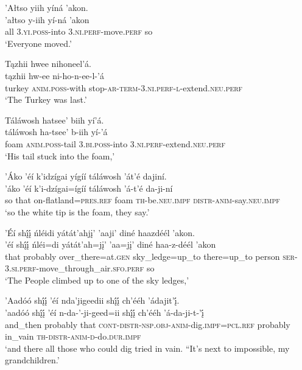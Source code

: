 \ea\label{ex:text4-3-15}
’Ałtso yiih yíná ’akon.\\
\gll ’ałtso	y-iih	yí-ná	’akon\\
     all	3.\textsc{yi}.\textsc{poss}-into	3.\textsc{ni}.\textsc{perf}-move.\textsc{perf}	so\\
\glt `Everyone moved.'
\z

\ea\label{ex:text4-3-16}
Tązhii hwee nihoneel’á.\\
\gll tązhii	hw-ee	ni-ho-n-ee-l-’á\\
     turkey	\textsc{anim}.\textsc{poss}-with	stop-\textsc{ar}-\textsc{term}-3.\textsc{ni}.\textsc{perf}-\textsc{l}-extend.\textsc{neu}.\textsc{perf}\\
\glt `The Turkey was last.'
\z

\ea\label{ex:text4-3-17}
Táláwosh hatsee’ biih yí’á.\\
\gll táláwosh	ha-tsee’	b-iih	yí-’á\\
     foam	\textsc{anim}.\textsc{poss}-tail	3.\textsc{bi}.\textsc{poss}-into	3.\textsc{ni}.\textsc{perf}-extend.\textsc{neu}.\textsc{perf}\\
\glt `His tail stuck into the foam,'
\z

\ea\label{ex:text4-3-18}
’Áko ’éí k’idzígai yígíí táláwosh ’át’é dajiní.\\
\gll ’áko	’éí	k’i-dzígai=ígíí	táláwosh	’á-t’é	da-ji-ní\\
     so	that	on-flatland=\textsc{pres}.\textsc{ref}	foam	\textsc{th}-be.\textsc{neu}.\textsc{impf}	\textsc{distr}-\textsc{anim}-say.\textsc{neu}.\textsc{impf}\\
\glt `so the white tip is the foam, they say.'
\z

\ea\label{ex:text4-3-19}
’Éí shį́į́ ńléidi yátát’ahjį’ ’aaji’ diné haazdéél ’akon.\\
\gll ’éí	shį́į́	ńléi=di	yátát’ah=jį’	’aa=jį’	diné	haa-z-déél	’akon\\
     that	probably	over\_there=at.\textsc{gen}	sky\_ledge=up\_to	there=up\_to	person	\textsc{ser}-3.\textsc{si}.\textsc{perf}-move\_through\_air.\textsc{sfo}.\textsc{perf}	so\\
\glt `The People climbed up to one of the sky ledges,'
\z

\ea\label{ex:text4-3-20}
’Aadóó shį́į́ ’éí nda’jigeedii shį́į́ ch’ééh ’ádajit’į́.\\
\gll ’aadóó	shį́į́	’éí	n-da-’-ji-geed=ii	shį́į́	ch’ééh	’á-da-ji-t-’į́\\
     and\_then	probably	that	\textsc{cont}-\textsc{distr}-\textsc{nsp}.\textsc{obj}-\textsc{anim}-dig.\textsc{impf}=\textsc{pcl}.\textsc{ref}	probably	in\_vain	\textsc{th}-\textsc{distr}-\textsc{anim}-\textsc{d}-do.\textsc{dur}.\textsc{impf}\\
\glt `and there all those who could dig tried in vain. ``It's next to impossible, my grandchildren.'
\z

